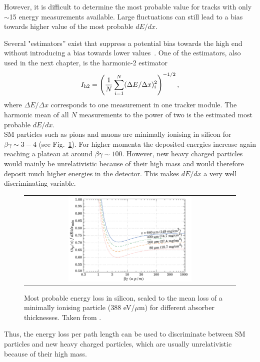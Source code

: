 However, it is difficult to determine the most probable value for tracks with only $\sim$15 energy measurements available.
Large fluctuations can still lead to a bias towards higher value of the most probable $dE/dx$.

Several "estimators'' exist that suppress a potential bias towards the high end without introducing a bias towards lower values~\cite{bib:Quertenmont_2010}.
One of the estimators, also used in the next chapter, is the harmonic-2 estimator
\begin{equation}
I_{\text{h2}}=\left( \frac{1}{N}\sum_{i=1}^{N}(\Delta E/\Delta x)_i^2 \right)^{-1/2},
\label{eq:Harmonic2Estimator}
\end{equation}
where $\Delta E /\Delta x$ corresponds to one measurement in one tracker module. 
The harmonic mean of all $N$ measurements to the power of two is the estimated most probable $dE/dx$.\\

SM particles such as pions and muons are minimally ionising in silicon for $\beta\gamma \sim 3-4$ (see Fig.~\ref{fig:dEdx_Landau_Silicon}). 
For higher momenta the deposited energies increase again reaching a plateau at around $\beta\gamma\sim100$. 
However, new heavy charged particles would mainly be unrelativistic because of their high mass and would therefore deposit much higher energies in the detector.
This makes $dE/dx$  a very well discriminating variable.
\begin{figure}[!bt]
  \centering 
  \begin{tabular}{c}
  \includegraphics[width=0.6\textwidth]{figures/analysis/dEdx_Landau_Silicon.png}
  \end{tabular}
  \caption{Most probable energy loss in silicon, scaled to the mean loss of a minimally ionising particle (388 eV/$\mu$m) for different absorber thicknesses. Taken from \cite{bib:PDG_2014}.} 
  \label{fig:dEdx_Landau_Silicon}
\end{figure}
Thus, the energy loss per path length can be used to discriminate between SM particles and new heavy charged particles, which are usually unrelativistic because of their high mass.

